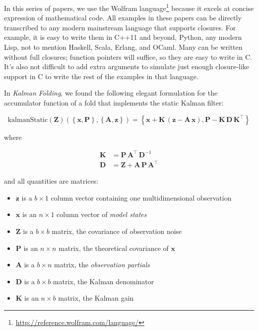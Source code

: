 \documentclass[10pt,oneside,x11names]{article}
\begin{document}
In this series of papers, we use the Wolfram language\footnote{\url{http://reference.wolfram.com/language/}} because it excels
at concise expression of mathematical code. All examples in these papers can be
directly transcribed to any modern mainstream language that supports closures.
For example, it is easy to write them in C++11 and beyond, Python, any modern
Lisp, not to mention Haskell, Scala, Erlang, and OCaml. Many can be written
without full closures; function pointers will suffice, so they are easy to write
in C. It's also not difficult to add extra arguments to simulate just enough
closure-like support in C to write the rest of the examples in that language.


In \emph{Kalman Folding},\footnotemark[1]{} we found the following elegant formulation for the
accumulator function of a fold that implements the static Kalman filter:

\begin{equation}
\label{eqn:kalman-cume-definition}
\text{kalmanStatic}
\left(
\mathbold{Z}
\right)
\left(
\left\{
\mathbold{x},
\mathbold{P}
\right\},
\left\{
\mathbold{A},
\mathbold{z}
\right\}
\right) =
\left\{
\mathbold{x}+
\mathbold{K}\,
\left(
\mathbold{z}-
\mathbold{A}\,
\mathbold{x}
\right),
\mathbold{P}-
\mathbold{K}\,
\mathbold{D}\,
\mathbold{K}^\intercal
\right\}
\end{equation}

\noindent where

\begin{align}
\label{eqn:kalman-gain-definition}
\mathbold{K}
&=
\mathbold{P}\,
\mathbold{A}^\intercal\,
\mathbold{D}^{-1} \\
\label{eqn:kalman-denominator-definition}
\mathbold{D}
&= \mathbold{Z} +
\mathbold{A}\,
\mathbold{P}\,
\mathbold{A}^\intercal
\end{align}

\noindent and all quantities are matrices:

\begin{itemize}
\item \(\mathbold{z}\) is a  \({b}\times{1}\) column vector containing one multidimensional observation
\item \(\mathbold{x}\) is an \({n}\times{1}\) column vector of \emph{model states}
\item \(\mathbold{Z}\) is a  \({b}\times{b}\) matrix, the covariance of
observation noise
\item \(\mathbold{P}\) is an \({n}\times{n}\) matrix, the theoretical
covariance of \(\mathbold{x}\)
\item \(\mathbold{A}\) is a  \({b}\times{n}\) matrix, the \emph{observation partials}
\item \(\mathbold{D}\) is a  \({b}\times{b}\) matrix, the Kalman denominator
\item \(\mathbold{K}\) is an \({n}\times{b}\) matrix, the Kalman gain
\end{itemize}
\end{document}
